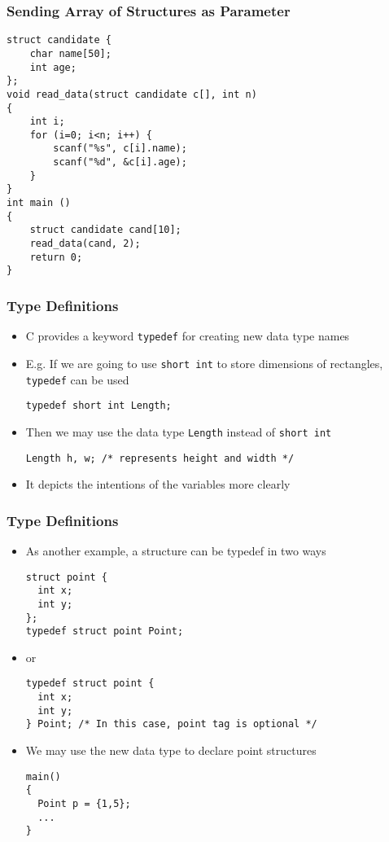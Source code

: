 \documentclass[11pt]{beamer}
\begin{document}
\begin{frame}[fragile]\frametitle{Sending Array of Structures as Parameter}
\label{sec-1-9}


\begin{verbatim}
struct candidate {
    char name[50];
    int age;
};
void read_data(struct candidate c[], int n)
{
    int i;
    for (i=0; i<n; i++) {
        scanf("%s", c[i].name);
        scanf("%d", &c[i].age);
    }
}
int main ()
{
    struct candidate cand[10];
    read_data(cand, 2);
    return 0;
}
\end{verbatim}
\end{frame}
\begin{frame}[fragile]\frametitle{Type Definitions}
\label{sec-1-10}

\begin{itemize}
\item C provides a keyword \verb~typedef~ for creating new data type names
\item E.g. If we are going to use \verb~short int~ to store dimensions of rectangles, \verb~typedef~ can be used

\begin{verbatim}
typedef short int Length;
\end{verbatim}
\item Then we may use the data type \verb~Length~ instead of \verb~short int~

\begin{verbatim}
Length h, w; /* represents height and width */
\end{verbatim}
\item It depicts the intentions of the variables more clearly
\end{itemize}
\end{frame}
\begin{frame}[fragile]\frametitle{Type Definitions}
\label{sec-1-11}

\begin{itemize}
\item As another example, a structure can be typedef in two ways

\begin{verbatim}
struct point {
  int x;
  int y;
};
typedef struct point Point;
\end{verbatim}
\item or 

\begin{verbatim}
typedef struct point {
  int x;
  int y;
} Point; /* In this case, point tag is optional */
\end{verbatim}
\item We may use the new data type to declare point structures

\begin{verbatim}
main()
{
  Point p = {1,5};
  ...
}
\end{verbatim}
\end{itemize}
\end{frame}
\end{document}
